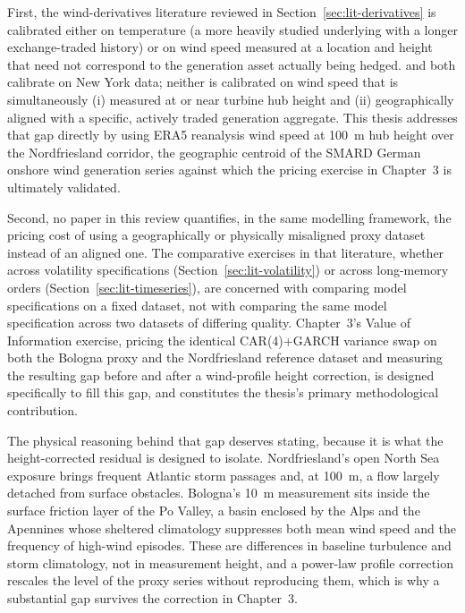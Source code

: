 ﻿\documentclass[11pt, a4paper, twoside]{article}
\begin{document}
First, the wind-derivatives literature reviewed in Section~\ref{sec:lit-derivatives} is calibrated either on temperature (a more heavily studied underlying with a longer exchange-traded history) or on wind speed measured at a location and height that need not correspond to the generation asset actually being hedged. \citet{BenthSaltyteBenth2009} and \citet{AlexandridisZapranis2013} both calibrate on New York data; neither is calibrated on wind speed that is simultaneously (i) measured at or near turbine hub height and (ii) geographically aligned with a specific, actively traded generation aggregate. This thesis addresses that gap directly by using ERA5 reanalysis wind speed at 100~m hub height over the Nordfriesland corridor, the geographic centroid of the SMARD German onshore wind generation series against which the pricing exercise in Chapter~3 is ultimately validated.

Second, no paper in this review quantifies, in the same modelling framework, the pricing cost of using a geographically or physically misaligned proxy dataset instead of an aligned one. The comparative exercises in that literature, whether across volatility specifications (Section~\ref{sec:lit-volatility}) or across long-memory orders (Section~\ref{sec:lit-timeseries}), are concerned with comparing model specifications on a fixed dataset, not with comparing the same model specification across two datasets of differing quality. Chapter~3's Value of Information exercise, pricing the identical CAR(4)+GARCH variance swap on both the Bologna proxy and the Nordfriesland reference dataset and measuring the resulting gap before and after a wind-profile height correction, is designed specifically to fill this gap, and constitutes the thesis's primary methodological contribution.

The physical reasoning behind that gap deserves stating, because it is what the height-corrected residual is designed to isolate. Nordfriesland's open North Sea exposure brings frequent Atlantic storm passages and, at 100~m, a flow largely detached from surface obstacles. Bologna's 10~m measurement sits inside the surface friction layer of the Po Valley, a basin enclosed by the Alps and the Apennines whose sheltered climatology suppresses both mean wind speed and the frequency of high-wind episodes. These are differences in baseline turbulence and storm climatology, not in measurement height, and a power-law profile correction rescales the level of the proxy series without reproducing them, which is why a substantial gap survives the correction in Chapter~3.
\end{document}
